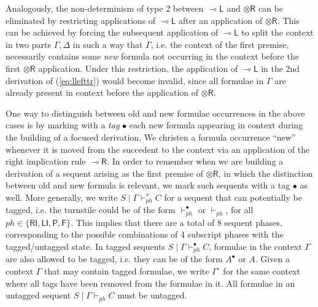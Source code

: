 \documentclass[submission,copyright,creativecommons]{eptcs}
\theoremstyle{definition}
\newcommand{\tr}{\otimes \mathsf{R}}
\newcommand{\lright}{{\multimap}\mathsf{R}}
\newcommand{\lleft}{{\multimap}\mathsf{L}}
\newcommand{\RI}{\mathsf{RI}}
\newcommand{\LI}{\mathsf{LI}}
\newcommand{\Pass}{\mathsf{P}}
\newcommand{\F}{\mathsf{F}}
\newcommand{\xvdash}{\vdash^{x}}
\begin{document}
Analogously, the non-determinism of type 2 between $\lleft$ and $\tr$ can be eliminated by restricting applications of $\lleft$ after an application of $\tr$. This can be achieved by forcing the subsequent application of $\lleft$ to split the context in two parts $\Gamma,\Delta$ in such a way that $\Gamma$, i.e. the context of the first premise, necessarily contains some \emph{new} formula not occurring in the context before the first $\tr$ application. Under this restriction, the application of $\lleft$ in the 2nd derivation of (\ref{eq:llefttr}) would become invalid, since all formulae in $\Gamma$ are already present in context before the application of $\tr$.

One way to distinguish between old and new formulae occurrences in the above cases is by marking with a \emph{tag} $\bullet$ each new formula appearing in context during the building of a focused derivation. We christen a formula occurrence ``new'' whenever it is moved from the succedent to the context via an application of the right implication rule $\lright$. In order to remember when we are building a derivation of a sequent arising as the first premise of $\tr$, in which the distinction between old and new formula is relevant, we mark such sequents with a tag $\bullet$ as well.
More generally, we write $S \mid \Gamma \xvdash_{ph} C$ for a sequent that can potentially be tagged, i.e. the turnstile could be of the form $\vdash_{ph}^{\bullet}$ or $\vdash_{ph}$, for all $ph \in \{ \RI,\LI,\Pass,\F\}$. This implies that there are a total of 8 sequent phases, corresponding to the possible combinations of 4 subscript phases with the tagged/untagged state.
In tagged sequents  $S \mid \Gamma \vdash_{ph}^{\bullet} C$, formulae in the context $\Gamma$ are also allowed to be tagged, i.e. they can be of the form $A^\bullet$ or $A$. Given a context $\Gamma$ that may contain tagged formulae, we write $\Gamma^{\circ}$ for the same context where all tags have been removed from the formulae in it. All formulae in an untagged sequent $S \mid \Gamma \vdash_{ph} C$ must be untagged.
\end{document}
